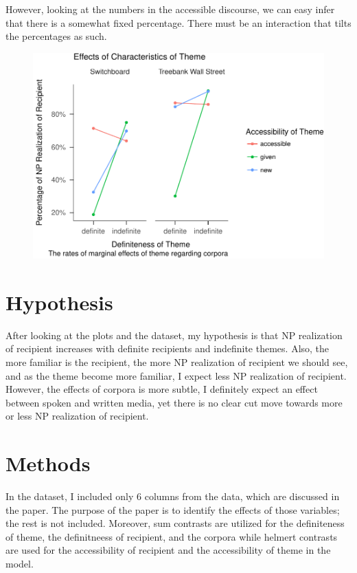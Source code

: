 \documentclass[english,floatsintext,man]{apa6}
\theoremstyle{definition}
\theoremstyle{definition}
\theoremstyle{definition}
\theoremstyle{remark}
\begin{document}
However, looking at the numbers in the accessible discourse, we can easy
infer that there is a somewhat fixed percentage. There must be an
interaction that tilts the percentages as such.

\begin{figure}
\centering
\includegraphics{papaja_files/figure-latex/thm_plots-1.pdf}
\caption{}
\end{figure}

\section{Hypothesis}\label{hypothesis}

After looking at the plots and the dataset, my hypothesis is that NP
realization of recipient increases with definite recipients and
indefinite themes. Also, the more familiar is the recipient, the more NP
realization of recipient we should see, and as the theme become more
familiar, I expect less NP realization of recipient. However, the
effects of corpora is more subtle, I definitely expect an effect between
spoken and written media, yet there is no clear cut move towards more or
less NP realization of recipient.

\section{Methods}\label{methods}

In the dataset, I included only 6 columns from the data, which are
discussed in the paper. The purpose of the paper is to identify the
effects of those variables; the rest is not included. Moreover, sum
contrasts are utilized for the definiteness of theme, the definitneess
of recipient, and the corpora while helmert contrasts are used for the
accessibility of recipient and the accessibility of theme in the model.
\end{document}
